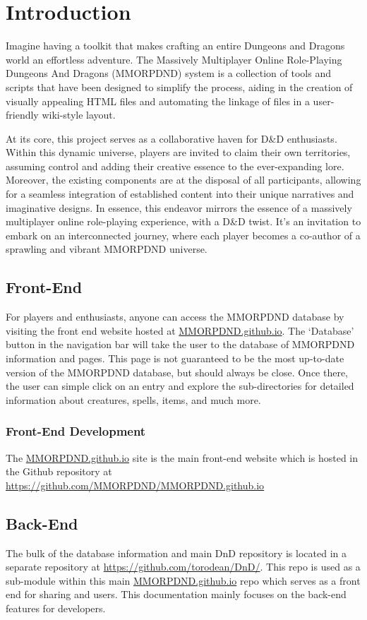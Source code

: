 \chapter{Introduction}
\thispagestyle{fancy}  %

Imagine having a toolkit that makes crafting an entire Dungeons and Dragons world an effortless adventure. The Massively Multiplayer Online Role-Playing Dungeons And Dragons (MMORPDND) system is a collection of tools and scripts that have been designed to simplify the process, aiding in the creation of visually appealing HTML files and automating the linkage of files in a user-friendly wiki-style layout.

At its core, this project serves as a collaborative haven for D\&D enthusiasts. Within this dynamic universe, players are invited to claim their own territories, assuming control and adding their creative essence to the ever-expanding lore. Moreover, the existing components are at the disposal of all participants, allowing for a seamless integration of established content into their unique narratives and imaginative designs. In essence, this endeavor mirrors the essence of a massively multiplayer online role-playing experience, with a D\&D twist. It's an invitation to embark on an interconnected journey, where each player becomes a co-author of a sprawling and vibrant MMORPDND universe.




\section{Front-End}

For players and enthusiasts, anyone can access the MMORPDND database by visiting the front end website hosted at \url{MMORPDND.github.io}. The `Database' button in the navigation bar will take the user to the database of MMORPDND information and pages. This page is not guaranteed to be the most up-to-date version of the MMORPDND database, but should always be close. Once there, the user can simple click on an entry and explore the sub-directories for detailed information about creatures, spells, items, and much more.

\subsection{Front-End Development}

The \url{MMORPDND.github.io} site is the main front-end website which is hosted in the Github repository at \url{https://github.com/MMORPDND/MMORPDND.github.io}




\section{Back-End}

The bulk of the database information and main DnD repository is located in a separate repository at \url{https://github.com/torodean/DnD/}. This repo is used as a sub-module within this main \url{MMORPDND.github.io} repo which serves as a front end for sharing and users. This documentation mainly focuses on the back-end features for developers.